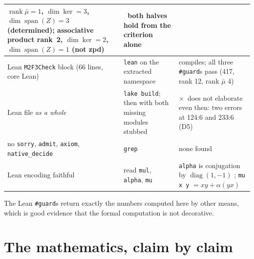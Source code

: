 \documentclass[11pt,a4paper]{article}
\newcommand{\yes}{\checkmark}
\newcommand{\no}{$\times$}
\newcommand{\cpt}[1]{\texttt{#1}}          %
\begin{document}
\begin{center}
\begin{tabular}{@{}L{0.275\textwidth}L{0.36\textwidth}L{0.29\textwidth}@{}}
  $\operatorname{rank}\bar\mu=1$, $\dim\ker=3$, $\dim\operatorname{span}(Z)=3$ (determined);
  associative product rank~2, $\dim\ker=2$, $\dim\operatorname{span}(Z)=1$ (not zpd)
  & \yes\ both halves hold from the criterion alone\\
\midrule
Lean \cpt{M2F3Check} block (66 lines, core Lean) & \cpt{lean} on the extracted namespace
  & compiles; all three \cpt{\#guard}s pass (417, rank 12, rank $\bar\mu$ 4)\\
Lean file \emph{as a whole} & \cpt{lake build}; then with both missing modules stubbed & \no\ does not elaborate even then: two errors at 124:6 and 233:6 (D5)\\
no \cpt{sorry}, \cpt{admit}, \cpt{axiom}, \cpt{native\_decide} & \cpt{grep} & none found \yes\\
Lean encoding faithful & read \cpt{mul}, \cpt{alpha}, \cpt{mu}
  & \cpt{alpha} is conjugation by $\operatorname{diag}(1,-1)$ \yes; \cpt{mu x y} $=xy+\alpha(yx)$ \yes\\
\bottomrule
\end{tabular}
\end{center}

The Lean \cpt{\#guard}s return exactly the numbers computed here by other means, which is good evidence
that the formal computation is not decorative.

\section{The mathematics, claim by claim}
\label{sec:math}
\end{document}
